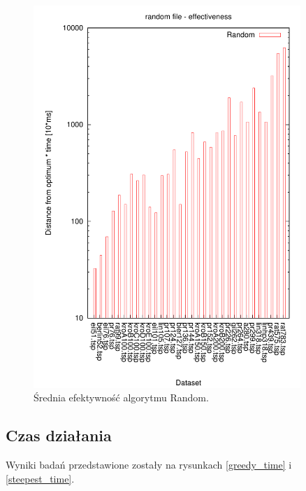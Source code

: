 \begin{figure}
\begin{center}
\includegraphics[width=0.9\textwidth]{wykresy/random_ef}
\end{center}
\caption{Średnia efektywność algorytmu Random.}
\label{random_ef}
\end{figure}

\subsection{Czas działania}

Wyniki badań przedstawione zostały na rysunkach \ref{greedy_time} i \ref{steepest_time}.

